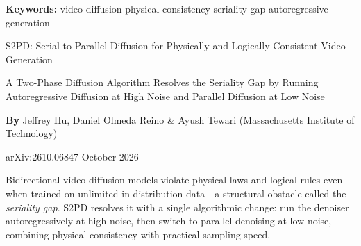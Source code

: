 \documentclass[10pt,twocolumn]{article}
\begin{document}
\setlength{\parindent}{0pt}
\setlength{\parskip}{4pt}

{\small\color{keywordgray}\textbf{Keywords:}
  video diffusion \textbullet{}
  physical consistency \textbullet{}
  seriality gap \textbullet{}
  autoregressive generation}\par\vspace{4pt}

{\LARGE\bfseries\raggedright
  S2PD: Serial-to-Parallel Diffusion for Physically and Logically
  Consistent Video Generation}\par\vspace{4pt}

{\large\itshape\raggedright
  A Two-Phase Diffusion Algorithm Resolves the Seriality Gap by Running
  Autoregressive Diffusion at High Noise and Parallel Diffusion at Low Noise}\par\vspace{6pt}

{\small\textbf{By} Jeffrey Hu, Daniel Olmeda Reino \& Ayush Tewari
  (Massachusetts Institute of Technology)}\par\vspace{2pt}

{\small\color{keywordgray}arXiv:2610.06847 \textbullet{} October 2026}
\par\vspace{2pt}\noindent{\color{rulered}\rule{\columnwidth}{0.6pt}}\vspace{6pt}

Bidirectional video diffusion models violate physical laws and logical rules
even when trained on unlimited in-distribution data---a structural obstacle
called the \emph{seriality gap}. S2PD resolves it with a single algorithmic
change: run the denoiser autoregressively at high noise, then switch to
parallel denoising at low noise, combining physical consistency with practical
sampling speed.
\end{document}
